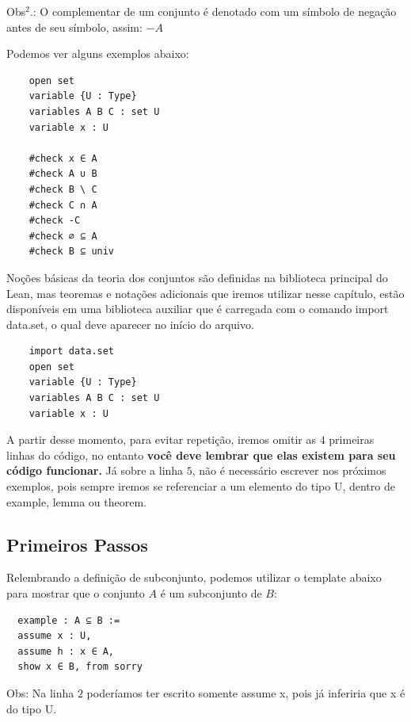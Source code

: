   Obs$^{2}$.: O complementar de um conjunto é denotado com um símbolo de negação antes de seu símbolo, assim: $-A$

  Podemos ver alguns exemplos abaixo:
  \begin{lstlisting}
    open set
    variable {U : Type}
    variables A B C : set U
    variable x : U

    #check x ∈ A
    #check A ∪ B
    #check B \ C
    #check C ∩ A
    #check -C
    #check ∅ ⊆ A
    #check B ⊆ univ \end{lstlisting}

  Noções básicas da teoria dos conjuntos são definidas na biblioteca principal do Lean, mas teoremas e notações adicionais que iremos utilizar nesse capítulo, estão disponíveis em uma biblioteca auxiliar que é carregada com o comando 
  { \selectfont import data.set}, o qual deve aparecer no início do arquivo.

  \begin{lstlisting}
    import data.set
    open set
    variable {U : Type}
    variables A B C : set U
    variable x : U \end{lstlisting}

  A partir desse momento, para evitar repetição, iremos omitir as $4$ primeiras linhas do código, no entanto \textbf{você deve lembrar que elas existem para seu código funcionar.} Já sobre a linha $5$, não é necessário escrever nos próximos exemplos, pois sempre iremos se referenciar a um elemento do tipo{ \selectfont U}, dentro de {\selectfont example, lemma} ou {\selectfont theorem}.

  \subsection{Primeiros Passos}

  Relembrando a definição de subconjunto, podemos utilizar o template abaixo para mostrar que o conjunto $A$ é um subconjunto de $B$:

  \begin{lstlisting}
  example : A ⊆ B :=
  assume x : U,
  assume h : x ∈ A,
  show x ∈ B, from sorry \end{lstlisting}

  Obs: Na linha $2$ poderíamos ter escrito somente {\selectfont assume x}, pois já inferiria que {\selectfont x} é do tipo {\selectfont U}.

